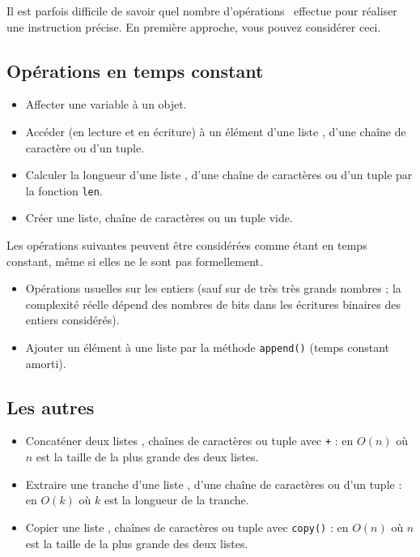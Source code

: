 Il est parfois difficile de savoir quel nombre d'opérations \python\ effectue pour réaliser une instruction précise. 
En première approche, vous pouvez considérer ceci.

\subsection{Opérations en temps constant}

\begin{itemize}
  \item[\textbullet] Affecter une variable à un objet.
  \item[\textbullet] Accéder (en lecture et en écriture) à un élément d'une liste \python, d'une chaîne de caractère ou d'un tuple. 
  \item[\textbullet] Calculer la longueur d'une liste \python, d'une chaîne de caractères ou d'un tuple par la fonction \texttt{len}.
  \item[\textbullet] Créer une liste, chaîne de caractères ou un tuple vide.
\end{itemize}

Les opérations suivantes peuvent être considérées comme étant en temps constant, même si elles ne le sont pas formellement.

\begin{itemize}
  \item[\textbullet] Opérations usuelles sur les entiers (sauf sur de très très grands nombres ; la complexité réelle dépend des nombres de bits dans les écritures binaires des entiers considérés).
  \item[\textbullet] Ajouter un élément à une liste par la méthode \texttt{append()} (temps constant amorti).
\end{itemize}

\subsection{Les autres}

\begin{itemize}
  \item[\textbullet] Concaténer deux listes \python, chaînes de caractères ou tuple avec \texttt{+} : en $O(n)$ où $n$ est la taille de la plus grande des deux listes.
  \item[\textbullet] Extraire une tranche d'une liste \python, d'une chaîne de caractères ou d'un tuple : en $O(k)$ où $k$ est la longueur de la tranche.
  \item[\textbullet] Copier une liste \python, chaînes de caractères ou tuple avec \texttt{copy()} : en $O(n)$ où $n$ est la taille de la plus grande des deux listes.
\end{itemize}

